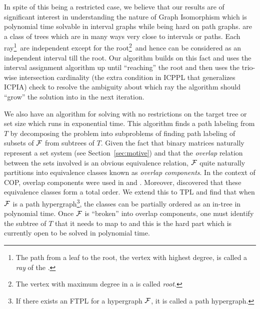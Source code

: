In spite of this being a restricted case, we believe that our results
are of significant interest in understanding the nature of {\sc Graph
  Isomorphism} which is polynomial time solvable in interval graphs
while being hard on path graphs\cite{kklv10}. {\kstars} are a class of
trees which are in many ways very close to intervals or paths. Each
ray\footnote{The path from a leaf to the root, the vertex with highest
  degree, is called a {\em ray} of the \kstar.}~\footnotemark[4] are
independent except for the root\footnote{The vertex with maximum
  degree in a {\kstar} is called {\em root}.}~\footnotemark[4] and
hence can be considered as an independent interval till the root. Our
algorithm builds on this fact and uses the interval assignment
algorithm\cite{nsnrs09} up until ``reaching'' the root and then uses
the trio-wise intersection cardinality (the extra condition in ICPPL
that generalizes ICPIA) check to resolve the ambiguity about which ray
the algorithm should ``grow'' the solution into in the next iteration.

We also have an algorithm for solving {\CFTPL} with no restrictions on
the target tree or set size which runs in exponential time.  This
algorithm finds a path labeling from $T$ by decomposing the problem
into subproblems of finding path labeling of subsets of ${\cal F}$ from
subtrees of $T$. Given the fact that binary matrices naturally
represent a set system (see Section~\ref{sec:motive}) and that the
{\em overlap} relation between the sets involved is an obvious
equivalence relation, ${\cal F}$ quite naturally partitions into
equivalence classes known as {\em overlap components}. In the context
of COP, overlap components were used in \cite{wlh02} and
\cite{kklv10}. Moreover, \cite{nsnrs09} discovered that these
equivalence classes form a total order. We extend this to TPL and find
that when ${\cal F}$ is a path hypergraph\footnote{If there exists an FTPL
  for a hypergraph ${\cal F}$, it is called a path hypergraph.}, the
classes can be partially ordered as an in-tree in polynomial
time. Once ${\cal F}$ is ``broken'' into overlap components, one must
identify the subtree of $T$ that it needs to map to and this is the
hard part which is currently open to be solved in polynomial time.
